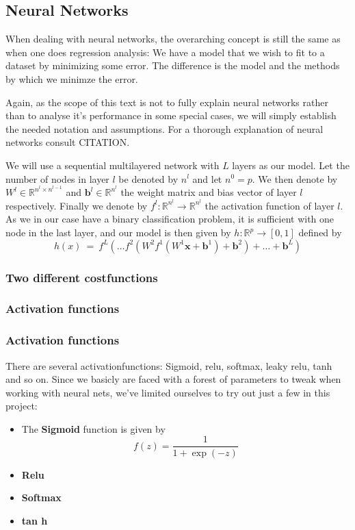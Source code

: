 \documentclass[a4paper,english]{article}
\begin{document}
\subsection{Neural Networks}
When dealing with neural networks, the overarching concept is still the 
same as when one does regression analysis: We have a model that we wish 
to fit to a dataset by minimizing some error. The difference 
is the model and the methods by which we minimze the error.
\par
Again, as the scope of this text is not to fully explain neural networks
rather than to analyse it's performance in some special cases, we will
simply establish the needed notation and assumptions. For a thorough
explanation of neural networks consult CITATION.
\par
We will use a sequential multilayered network with $L$ layers as our model.
Let the number of nodes in layer $l$ be denoted by $n^l$ and let 
$n^0 = p$. We then denote
by $W^l \in \mathbb{R}^{n^l \times n^{l-1}}$ and 
$\bm{b}^l \in \mathbb{R}^{n^l}$ the weight matrix and bias 
vector of layer $l$ respectively. 
Finally we denote by $f^l: \mathbb{R}^{n^l} \rightarrow \mathbb{R}^{n^l}$ 
the activation function of 
layer $l$. As we in our case have a binary classification problem,
it is sufficient with one node in the last layer, and our model is then
given by $h: \mathbb{R}^p \rightarrow [0,1]$ defined by
\begin{equation}
    h(x) \ = \ f^L( \dots f^2(W^2 f^1(W^1 \bm{x} + \bm{b}^1) + \bm{b}^2) 
    + \dots + \bm{b}^L)
\end{equation}

\subsubsection{Two different costfunctions}

\subsubsection{Activation functions}

\subsubsection{Activation functions}
There are several activationfunctions: Sigmoid, relu, softmax, 
leaky relu, tanh and
so on. Since we basicly are faced with a forest of parameters to tweak
when working with neural nets, we've limited ourselves to try out just a 
few in this project:
\begin{itemize}
    \item
        The \textbf{Sigmoid} function is given by 
        \begin{equation}
            f(z) = \frac{1}{1 + \exp(-z)}
        \end{equation}
    \item
        \textbf{Relu}
    \item
        \textbf{Softmax}
    \item
        \textbf{tan h}
\end{itemize}
\end{document}
